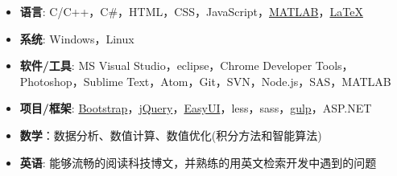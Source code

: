   \begin{itemize}[leftmargin=*]
    \item \textbf{语言}: C/C++，C\#，HTML，CSS，JavaScript，\href{http://cn.mathworks.com/products/matlab/}{MATLAB}，\href{http://www.latex-project.org/}{\LaTeX}
    \item \textbf{系统}: Windows，Linux
    \item \textbf{软件/工具}: MS Visual Studio，eclipse，Chrome Developer Tools，Photoshop，Sublime Text，Atom，Git，SVN，Node.js，SAS，MATLAB
    \item \textbf{项目/框架}: \href{http://www.bootcss.com/}{Bootstrap}，\href{https://jquery.com/}{jQuery}，\href{http://jeasyui.com/}{EasyUI}，less，sass，\href{http://gulpjs.com/}{gulp}，ASP.NET
    \item \textbf{数学}：数据分析、数值计算、数值优化(积分方法和智能算法)
    \item \textbf{英语}: 能够流畅的阅读科技博文，并熟练的用英文检索开发中遇到的问题
  \end{itemize}